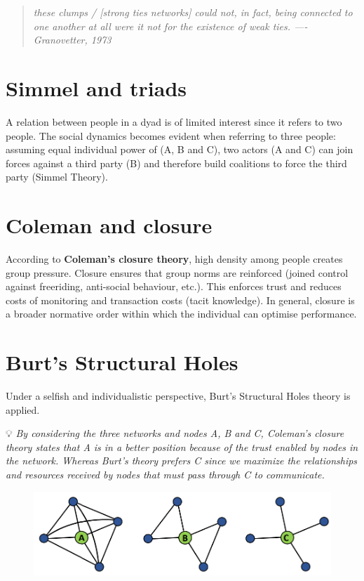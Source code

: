 \documentclass[
  notitlepage,
  onecolumn,
  openany]{book}
\begin{document}
\begin{quote}
\emph{these clumps / {[}strong ties networks{]} could not,
in fact, being connected to one another at all were
it not for the existence of weak ties.
---- Granovetter, 1973}
\end{quote}

\hypertarget{simmel-and-triads}{%
\section{Simmel and triads}\label{simmel-and-triads}}

A relation between people in a dyad is of limited interest since it refers to two people. The social dynamics becomes evident when referring to three people: assuming equal individual power of (A, B and C), two actors (A and C) can join forces against a third party (B) and therefore build coalitions to force the third party (Simmel Theory).

\hypertarget{coleman-and-closure}{%
\section{Coleman and closure}\label{coleman-and-closure}}

According to \textbf{Coleman's closure theory}, high density among people creates group pressure. Closure ensures that group norms are reinforced (joined control against freeriding, anti-social behaviour, etc.). This enforces trust and reduces costs of monitoring and transaction costs (tacit knowledge). In general, closure is a broader normative order within which the individual can optimise performance.

\hypertarget{burts-structural-holes}{%
\section{Burt's Structural Holes}\label{burts-structural-holes}}

Under a selfish and individualistic perspective, Burt's Structural Holes theory is applied.

💡 \emph{By considering the three networks and nodes A, B and C, Coleman's closure theory states that A is in a better position because of the trust enabled by nodes in the network. Whereas Burt's theory prefers C since we maximize the relationships and resources received by nodes that must pass through C to communicate.}

\begin{figure}[h!]

{\centering \includegraphics[width=0.5\linewidth]{images/07-Triads and structural holes/Untitled 2} 

}

\end{figure}
\end{document}
